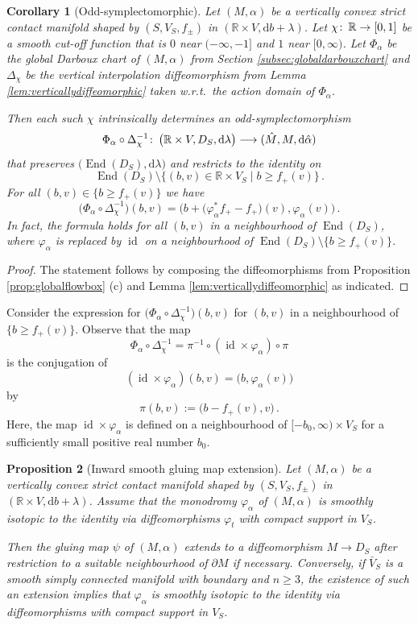 \documentclass{amsart}
\newtheorem{prop}{Proposition}[subsection]
\newtheorem{cor}[prop]{Corollary}
\theoremstyle{definition}
\def\co{\colon\thinspace}
\newcommand{\rmd}{\mathrm d}
\newcommand{\R}{\mathbb R}
\newcommand{\lra}{\longrightarrow}
\newcommand{\ra}{\rightarrow}
\DeclareMathOperator{\End}{\mathrm{End}}
\DeclareMathOperator{\id}{\mathrm{id}}
\begin{document}
\begin{cor}[Odd-symplectomorphic]
 \label{cor:oddsymlifnotrappedorbits}
 Let $(M,\alpha)$ be a vertically convex strict contact manifold
 shaped by $(S,V_S,f_{\pm})$ in $(\R\times V,\rmd b+\lambda)$.
 Let $\chi\co\R\ra[0,1]$ be a smooth cut-off function
 that is $0$ near $(-\infty,-1]$ and $1$ near $[0,\infty)$.
 Let $\Phi_{\alpha}$ be the global Darboux chart 
 of $(M,\alpha)$ from Section \ref{subsec:globaldarbouxchart}
 and
 $\Delta_{\chi}$ be the vertical interpolation diffeomorphism
 from Lemma \ref{lem:verticallydiffeomorphic}
 taken w.r.t.\ the action domain of $\Phi_{\alpha}$.
 
 Then each such $\chi$ intrinsically determines
 an odd-symplectomorphism
 \[
  \Phi_{\alpha}\circ\Delta_{\chi}^{-1}\co
  \big(\R\times V,D_S,\rmd\lambda\big)
  \lra
  (\hat{M},M,\rmd\hat{\alpha})
  \]
 that preserves $\big(\!\End(D_S),\rmd\lambda\big)$
 and restricts to the identity on
  \[
  \End(D_S)\setminus
  \big\{(b,v)\in\R\times V_S\mid b\geq f_+(v)\big\}
  \,.
  \]
  For all $(b,v)\in\{b\geq f_+(v)\}$ we have
  \[
  \big(\Phi_{\alpha}\circ\Delta_{\chi}^{-1}\big)(b,v)=
  \Big(
    b+\big(\varphi_{\alpha}^*f_+-f_+\big)(v),\varphi_{\alpha}(v)
  \Big)
  \,.
  \]
In fact, the formula holds
for all $(b,v)$ in a neighbourhood of $\End(D_S)$,
where $\varphi_{\alpha}$ is replaced by $\id$
on a neighbourhood of
$\End(D_S)\setminus\{b\geq f_+(v)\}$.
\end{cor}


\begin{proof}
The statement follows by composing
the diffeomorphisms from
Proposition \ref{prop:globalflowbox} (c) and
Lemma \ref{lem:verticallydiffeomorphic}
as indicated.
\end{proof}


Consider the expression for
$\big(\Phi_{\alpha}\circ\Delta_{\chi}^{-1}\big)(b,v)$
for $(b,v)$ in a neighbourhood of $\{b\geq f_+(v)\}$.
Observe that the map
\[
\Phi_{\alpha}\circ\Delta_{\chi}^{-1}
=
\pi^{-1}\circ(\id\times\varphi_{\alpha})\circ\pi
\]
is the conjugation of
\[
(\id\times\varphi_{\alpha})(b,v)=\big(b,\varphi_{\alpha}(v)\big)
\]
by
\[
\pi(b,v):=\big(b-f_+(v),v\big)
\,.
\]
Here,
the map $\id\times\varphi_{\alpha}$
is defined on a neighbourhood of $[-b_0,\infty)\times V_S$
for a sufficiently small positive real number $b_0$.


\begin{prop}[Inward smooth gluing map extension]
\label{prop:inwardextension}
 Let $(M,\alpha)$ be a vertically convex strict contact manifold
 shaped by $(S,V_S,f_{\pm})$ in $(\R\times V,\rmd b+\lambda)$.
 Assume that the monodromy $\varphi_{\alpha}$ of $(M,\alpha)$
 is smoothly isotopic to the identity
 via diffeomorphisms $\varphi_t$
 with compact support in $V_S$.
 
 Then the gluing map $\psi$ of $(M,\alpha)$
 extends to a diffeomorphism $M\ra D_S$
 after restriction to a suitable neighbourhood
 of $\partial M$ if necessary.
 Conversely,
 if $\bar{V}_S$ is a smooth
 simply connected manifold with boundary and $n\geq3$,
 the existence of such an extension implies
 that $\varphi_{\alpha}$ is smoothly isotopic to the identity
 via diffeomorphisms with compact support in $V_S$.
\end{prop}
\end{document}
